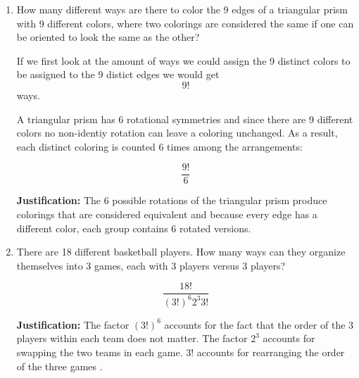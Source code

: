 \documentclass{article}
\begin{document}
\begin{enumerate}
\begin{enumerate}
 \textbf{Justification:}
 We divide by $3!$ twice for the three copies of $I$ and $N$, and by $2!$ for each of the five letters that appear twice. This removes all duplicate arrangments.

 \item How many different ways are there to color the 9 edges of a triangular prism with 9 different colors, where two colorings are considered the same if one can be oriented to look the same as the other?

 If we first look at the amount of ways we could assign the 9 distinct colors to be assigned to the 9 distict edges we would get 
 \[
 9!
 \]
 ways.

 A triangular prism has 6 rotational symmetries and since there are 9 different colors no non-identiy rotation can leave a coloring unchanged. As a result, each distinct coloring is counted 6 times among the arrangements:

 \[ 
 \boxed{
 \frac {9!}{6}
 }
 \]

 \textbf{Justification:}
 The 6 possible rotations of the triangular prism produce colorings that are considered equivalent and because every edge has a different color, each group contains 6 rotated versions.

 \item There are 18 different basketball players. How many ways can they organize themselves into 3 games, each with 3 players versus 3 players?

 
 \[
 \boxed{
 \frac{18!}{(3!)^6 2^3 3!}
 }
 \]

\textbf{Justification:}
The factor $(3!)^6$ accounts for the fact that the order of the 3 players within each team does not matter. The factor $2^3$ accounts for swapping the two teams in each game. $3!$ accounts for rearranging the order of the three games .

\end{enumerate}

\end {enumerate}
 
\end{document}
